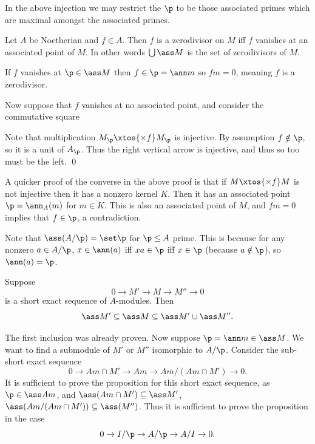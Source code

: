 \eproof

In the above injection we may restrict the $\p$ to be those associated primes which are maximal amongst the associated primes.

\bprop[name={asszerodiv}]

    Let $A$ be Noetherian and $f\in A$.
    Then $f$ is a zerodivisor on $M$ iff $f$ vanishes at an associated point of $M$.
    In other words $\bigcup\ass M$ is the set of zerodivisors of $M$.

\eprop

\bproof

    If $f$ vanishes at $\p\in\ass M$ then $f\in\p=\ann m$ so $fm=0$, meaning $f$ is a zerodivisor.

    Now suppose that $f$ vanishes at no associated point, and consider the commutative square


    Note that multiplication $M_\p\xtos{\times f}M_\p$ is injective.
    By assumption $f\notin\p$, so it is a unit of $A_\p$.
    Thus the right vertical arrow is injective, and thus so too must be the left.
    \qed

\eproof

A quicker proof of the converse in the above proof is that if $M\xtos{\times f}M$ is not injective then it has a nonzero kernel $K$.
Then it has an associated point $\p=\ann_A(m)$ for $m\in K$.
This is also an associated point of $M$, and $fm=0$ implies that $f\in\p$, a contradiction.

Note that $\ass(A/\p)=\set\p$ for $\p\leq A$ prime.
This is because for any nonzero $a\in A/\p$, $x\in\ann(a)$ iff $xa\in\p$ iff $x\in\p$ (because $a\notin\p$), so $\ann(a)=\p$.

\bprop[name={assses}]

    Suppose
    $$ 0 \to M' \to M \to M'' \to 0 $$
    is a short exact sequence of $A$-modules.
    Then
    $$ \ass M' \subseteq \ass M \subseteq \ass M' \cup \ass M'' . $$

\eprop

\bproof

    The first inclusion was already proven.
    Now suppose $\p=\ann m\in\ass M$.
    We want to find a submodule of $M'$ or $M''$ isomorphic to $A/\p$.
    Consider the sub-short exact sequence
    $$ 0 \to Am\cap M' \to Am \to Am/(Am\cap M') \to 0 . $$
    It is sufficient to prove the proposition for this short exact sequence, as $\p\in\ass Am$, and $\ass(Am\cap M')\subseteq\ass M'$, $\ass(Am/(Am\cap M'))\subseteq\ass(M'')$.
    Thus it is sufficient to prove the proposition in the case
    $$ 0 \to I/\p \to A/\p \to A/I \to 0 . $$


